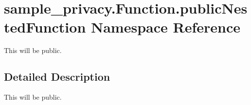 \hypertarget{namespacesample__privacy_1_1_function_1_1public_nested_function}{\section{sample\-\_\-privacy.\-Function.\-public\-Nested\-Function Namespace Reference}
\label{namespacesample__privacy_1_1_function_1_1public_nested_function}
}


This will be public.  




\subsection{Detailed Description}
This will be public. 